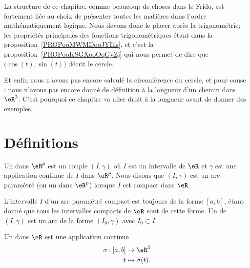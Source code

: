 
La structure de ce chapitre, comme beaucoup de choses dans le Frido, est fortement liée au choix de présenter toutes les matières dans l'ordre mathématiquement logique. Nous devons donc le placer après la trigonométrie; les propriétés principales des fonctions trigonométriques étant dans la proposition~\ref{PROPooMWMDooJYIlis}, et c'est la proposition~\ref{PROPooKSGXooOqGyZj} qui nous permet de dire que \( \big( \cos(t),\sin(t) \big)\) décrit le cercle.

Et enfin nous n'avons pas encore calculé la circonférence du cercle, et pour cause : nous n'avons pas encore donné de définition à la longueur d'un chemin dans \( \eR^2\). C'est pourquoi ce chapitre va aller droit à la longueur avant de donner des exemples.

\section{Définitions}        \label{SecDeExCPar}

\begin{definition}
	Un  dans $\eR^p$ est un couple $(I,\gamma)$ où $I$ est un intervalle de $\eR$ et $\gamma$ est une application continue de $I$ dans $\eR^p$. Nous disons que $(I,\gamma)$ est un arc paramétré  (ou un  dans $\eR^p$) lorsque $I$ est compact dans $\eR$.
\end{definition}
L'intervalle $I$ d'un arc paramétré compact est toujours de la forme $[a,b]$, étant donné que tous les intervalles compacts de $\eR$ sont de cette forme. Un  de $(I,\gamma)$ est un arc de la forme $(I_0,\gamma)$ avec $I_0\subset I$.

\begin{definition}
	Un  dans $\eR$ est une application continue
	\begin{equation}
		\begin{aligned}
			\sigma\colon [a,b] & \to \eR^3          \\
			t                  & \mapsto \sigma(t).
		\end{aligned}
	\end{equation}
\end{definition}

